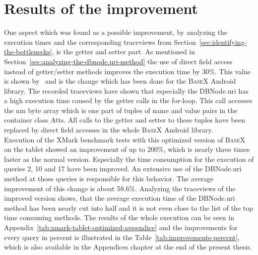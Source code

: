 
\section{Results of the improvement}
\label{sec:improving}
One aspect which was found as a possible improvement, by analyzing the execution times and the corresponding traceviews from Section~\ref{sec:identifying-the-bottlenecks}, is the getter and setter part.
As mentioned in Section~\ref{sec:analyzing-the-dbnode.uri-method} the use of direct field access instead of getter/setter methods improves the execution time by 30\%.
This value is shown by~\cite{toninievlautatingandroid} and is the change which has been done for the \textsc{BaseX} Android library.
The recorded traceviews have shown that especially the \textsf{DBNode.uri} has a high execution time caused by the getter calls in the for-loop.
This call accesses the \textsf{nm} byte array which is one part of tuples of name and value pairs in the container class \textsf{Atts}.
All calls to the getter and setter to these tuples have been replaced by direct field accesses in the whole \textsc{BaseX} Android library.\\
Execution of the XMark benchmark tests with this optimized version of \textsc{BaseX} on the tablet showed an improvement of up to 200\%, which is nearly three times faster as the normal version.
Especially the time consumption for the execution of queries 2, 10 and 17 have been improved.
An extensive use of the \textsf{DBNode.uri} method at those queries is responsible for this behavior.
The average improvement of this change is about 58.6\%.
Analyzing the traceviews of the improved version shows, that the average execution time of the \textsf{DBNode.uri} method has been nearly cut into half and it is not even close to the list of the top time consuming methods.
The results of the whole execution can be seen in Appendix~\ref{tab:xmark-tablet-optimized-appendice} and the improvements for every query in percent is illustrated in the Table~\ref{tab:improvements-percent}, which is also available in the Appendices chapter at the end of the present thesis.\\
